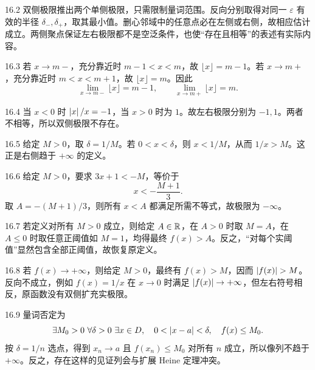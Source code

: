 \begin{solution}{16.2}
双侧极限推出两个单侧极限，只需限制量词范围。反向分别取得对同一 \(\varepsilon\) 有效的半径 \(\delta_-,\delta_+\)，取其最小值。删心邻域中的任意点必在左侧或右侧，故相应估计成立。两侧聚点保证左右极限都不是空泛条件，也使“存在且相等”的表述有实际内容。
\end{solution}

\begin{solution}{16.3}
若 \(x\to m-\)，充分靠近时 \(m-1<x<m\)，故 \(\lfloor x\rfloor=m-1\)。若 \(x\to m+\)，充分靠近时 \(m<x<m+1\)，故 \(\lfloor x\rfloor=m\)。因此
\[
 \lim_{x\to m-}\lfloor x\rfloor=m-1,\qquad
 \lim_{x\to m+}\lfloor x\rfloor=m.
\]
\end{solution}

\begin{solution}{16.4}
当 \(x<0\) 时 \(\left|x\right|/x=-1\)，当 \(x>0\) 时为 \(1\)。故左右极限分别为 \(-1,1\)。两者不相等，所以双侧极限不存在。
\end{solution}

\begin{solution}{16.5}
给定 \(M>0\)，取 \(\delta=1/M\)。若 \(0<x<\delta\)，则 \(x<1/M\)，从而 \(1/x>M\)。这正是右侧趋于 \(+\infty\) 的定义。
\end{solution}

\begin{solution}{16.6}
给定 \(M>0\)，要求 \(3x+1<-M\)，等价于
\[
 x<-\frac{M+1}{3}.
\]
取 \(A=-(M+1)/3\)，则所有 \(x<A\) 都满足所需不等式，故极限为 \(-\infty\)。
\end{solution}

\begin{solution}{16.7}
若定义对所有 \(M>0\) 成立，则给定 \(A\in\mathbb{R}\)，在 \(A>0\) 时取 \(M=A\)，在 \(A\le0\) 时取任意正阈值如 \(M=1\)，均得最终 \(f(x)>A\)。反之，“对每个实阈值”显然包含全部正阈值，故恢复原定义。
\end{solution}

\begin{solution}{16.8}
若 \(f(x)\to+\infty\)，则给定 \(M>0\)，最终有 \(f(x)>M\)，因而 \(\abs{f(x)}>M\)。反向不成立，例如 \(f(x)=1/x\) 在 \(x\to0\) 时满足 \(\left|f(x)\right|\to+\infty\)，但左右符号相反，原函数没有双侧扩充实极限。
\end{solution}

\begin{solution}{16.9}
量词否定为
\[
 \exists M_0>0\ \forall\delta>0\ \exists x\in D,\quad
 0<\left|x-a\right|<\delta,\quad f(x)\le M_0.
\]
按 \(\delta=1/n\) 选点，得到 \(x_n\to a\) 且 \(f(x_n)\le M_0\) 对所有 \(n\) 成立，所以像列不趋于 \(+\infty\)。反之，存在这样的见证列会与扩展 Heine 定理冲突。
\end{solution}

